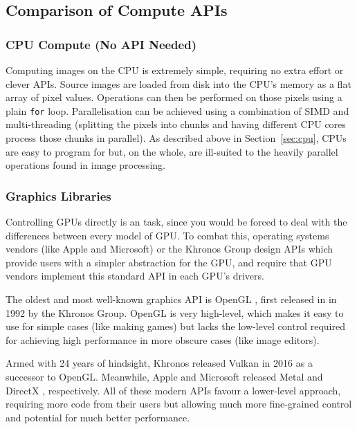 \documentclass[12pt]{article}
\begin{document}
\subsection{Comparison of Compute APIs}

\subsubsection{CPU Compute (No API Needed)}

Computing images on the CPU is extremely simple, requiring no extra effort or clever APIs.  Source
images are loaded from disk into the CPU's memory as a flat array of pixel values.  Operations can
then be performed on those pixels using a plain \verb|for| loop.  Parallelisation can be achieved
using a combination of SIMD and multi-threading (splitting the pixels into chunks and having
different CPU cores process those chunks in parallel).  As described above in Section~\ref{sec:cpu},
CPUs are easy to program for but, on the whole, are ill-suited to the heavily parallel operations
found in image processing.

\subsubsection{Graphics Libraries}

Controlling GPUs directly is an task, since you would be forced to deal with the differences between
every model of GPU.  To combat this, operating systems vendors (like Apple and Microsoft) or the
Khronos Group \cite{khronos} design APIs which provide users with a simpler
abstraction for the GPU, and require that GPU vendors implement this standard API in each GPU's
drivers.

The oldest and most well-known graphics API is OpenGL \cite{opengl}, first
released in in 1992 by the Khronos Group.  OpenGL is very high-level, which makes it easy to use for
simple cases (like making games) but lacks the low-level control required for achieving high
performance in more obscure cases (like image editors).

Armed with 24 years of hindsight, Khronos released Vulkan \cite{vulkan} in 2016
as a successor to OpenGL.  Meanwhile, Apple and Microsoft released
Metal \cite{metal} and
DirectX \cite{directx}, respectively.  All of these modern APIs
favour a lower-level approach, requiring more code from their users but allowing much more
fine-grained control and potential for much better performance.
\end{document}
